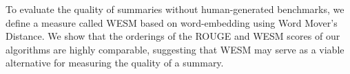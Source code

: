\documentclass[a4paper,twoside]{article}
\begin{document}
{%
To evaluate the quality of summaries %
without human-generated benchmarks, %
we define a measure called WESM based on word-embedding using %
Word Mover's Distance.
We show that
the orderings of the ROUGE and WESM scores of our algorithms are highly comparable, %
suggesting that WESM may serve as a viable alternative for measuring the quality of a summary.
}

\onecolumn \maketitle \normalsize \vfill
\end{document}
